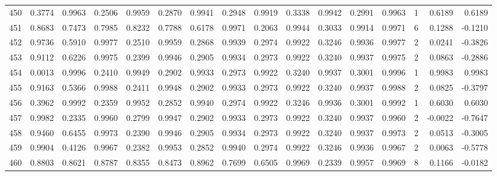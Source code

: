 \begin{tabular}{lrrrrrrrrrrrrrrr}
450 &      0.3774 &  0.9963 &  0.2506 &  0.9959 &  0.2870 &  0.9941 &  0.2948 &  0.9919 &  0.3338 &  0.9942 &   0.2991 &     0.9963 &      1 &                    0.6189 &                     0.6189 \\
451 &      0.8683 &  0.7473 &  0.7985 &  0.8232 &  0.7788 &  0.6178 &  0.9971 &  0.2063 &  0.9944 &  0.3033 &   0.9914 &     0.9971 &      6 &                    0.1288 &                    -0.1210 \\
452 &      0.9736 &  0.5910 &  0.9977 &  0.2510 &  0.9959 &  0.2868 &  0.9939 &  0.2974 &  0.9922 &  0.3246 &   0.9936 &     0.9977 &      2 &                    0.0241 &                    -0.3826 \\
453 &      0.9112 &  0.6226 &  0.9975 &  0.2399 &  0.9946 &  0.2905 &  0.9934 &  0.2973 &  0.9922 &  0.3240 &   0.9937 &     0.9975 &      2 &                    0.0863 &                    -0.2886 \\
454 &      0.0013 &  0.9996 &  0.2410 &  0.9949 &  0.2902 &  0.9933 &  0.2973 &  0.9922 &  0.3240 &  0.9937 &   0.3001 &     0.9996 &      1 &                    0.9983 &                     0.9983 \\
455 &      0.9163 &  0.5366 &  0.9988 &  0.2411 &  0.9948 &  0.2902 &  0.9933 &  0.2973 &  0.9922 &  0.3240 &   0.9937 &     0.9988 &      2 &                    0.0825 &                    -0.3797 \\
456 &      0.3962 &  0.9992 &  0.2359 &  0.9952 &  0.2852 &  0.9940 &  0.2974 &  0.9922 &  0.3246 &  0.9936 &   0.3001 &     0.9992 &      1 &                    0.6030 &                     0.6030 \\
457 &      0.9982 &  0.2335 &  0.9960 &  0.2799 &  0.9947 &  0.2902 &  0.9933 &  0.2973 &  0.9922 &  0.3240 &   0.9937 &     0.9960 &      2 &                   -0.0022 &                    -0.7647 \\
458 &      0.9460 &  0.6455 &  0.9973 &  0.2390 &  0.9946 &  0.2905 &  0.9934 &  0.2973 &  0.9922 &  0.3240 &   0.9937 &     0.9973 &      2 &                    0.0513 &                    -0.3005 \\
459 &      0.9904 &  0.4126 &  0.9967 &  0.2382 &  0.9953 &  0.2852 &  0.9940 &  0.2974 &  0.9922 &  0.3246 &   0.9936 &     0.9967 &      2 &                    0.0063 &                    -0.5778 \\
460 &      0.8803 &  0.8621 &  0.8787 &  0.8355 &  0.8473 &  0.8962 &  0.7699 &  0.6505 &  0.9969 &  0.2339 &   0.9957 &     0.9969 &      8 &                    0.1166 &                    -0.0182 \\

\end{tabular}
